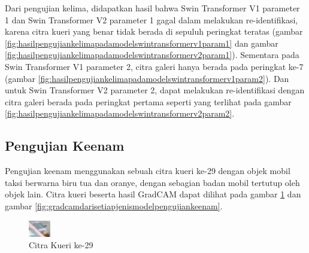 Dari pengujian kelima, didapatkan hasil bahwa Swin Transformer V1 parameter 1 dan Swin Transformer V2 parameter 1 
gagal dalam melakukan re-identifikasi, karena citra kueri yang benar tidak berada di sepuluh peringkat teratas (gambar 
\ref{fig:hasilpengujiankelimapadamodelswintransformerv1param1} dan gambar 
\ref{fig:hasilpengujiankelimapadamodelswintransformerv2param1}). Sementara pada Swin Transformer V1 parameter 2, citra 
galeri hanya berada pada peringkat ke-7 (gambar \ref{fig:hasilpengujiankelimapadamodelswintransformerv1param2}). 
Dan untuk Swin Transformer V2 parameter 2, dapat melakukan 
re-identifikasi dengan citra galeri berada pada peringkat pertama seperti yang terlihat pada gambar 
\ref{fig:hasilpengujiankelimapadamodelswintransformerv2param2}.

\subsection{Pengujian Keenam}

Pengujian keenam menggunakan sebuah citra kueri ke-29 dengan objek mobil taksi \linebreak berwarna biru tua dan oranye, dengan sebagian 
badan mobil tertutup oleh objek lain. Citra kueri beserta hasil GradCAM dapat dilihat pada gambar 
\ref{fig:gambarkueriuntukpengujiankeenam} dan gambar \ref{fig:gradcamdarisetiapjenismodelpengujiankeenam}.\\

\begin{figure}[h!]
  \centering
  \includegraphics[scale=3]{gambar/Que29_1060.jpg}
  \caption{Citra Kueri ke-29}
  \label{fig:gambarkueriuntukpengujiankeenam}
\end{figure}

